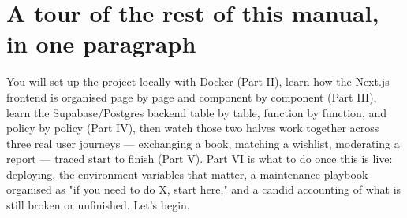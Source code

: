 \section{A tour of the rest of this manual, in one paragraph}

You will set up the project locally with Docker (Part II), learn how the Next.js frontend is organised page by page and component by component (Part III), learn the Supabase/Postgres backend table by table, function by function, and policy by policy (Part IV), then watch those two halves work together across three real user journeys — exchanging a book, matching a wishlist, moderating a report — traced start to finish (Part V). Part VI is what to do once this is live: deploying, the environment variables that matter, a maintenance playbook organised as "if you need to do X, start here," and a candid accounting of what is still broken or unfinished. Let's begin.
